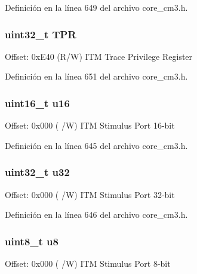 Definición en la línea 649 del archivo core\+\_\+cm3.\+h.

\subsubsection[{\texorpdfstring{T\+PR}{TPR}}]{ uint32\+\_\+t T\+PR}\hypertarget{struct_i_t_m___type_a72bb9b7d61fe3262cd2a6070a7bd5b69}{}\label{struct_i_t_m___type_a72bb9b7d61fe3262cd2a6070a7bd5b69}
Offset\+: 0x\+E40 (R/W) I\+TM Trace Privilege Register 

Definición en la línea 651 del archivo core\+\_\+cm3.\+h.

\subsubsection[{\texorpdfstring{u16}{u16}}]{ uint16\+\_\+t u16}\hypertarget{struct_i_t_m___type_ae8d499140220fa6d4eab1da7262bf08e}{}\label{struct_i_t_m___type_ae8d499140220fa6d4eab1da7262bf08e}
Offset\+: 0x000 ( /W) I\+TM Stimulus Port 16-\/bit 

Definición en la línea 645 del archivo core\+\_\+cm3.\+h.

\subsubsection[{\texorpdfstring{u32}{u32}}]{ uint32\+\_\+t u32}\hypertarget{struct_i_t_m___type_acaf6d0e14a3d4b541c624913b4a1931e}{}\label{struct_i_t_m___type_acaf6d0e14a3d4b541c624913b4a1931e}
Offset\+: 0x000 ( /W) I\+TM Stimulus Port 32-\/bit 

Definición en la línea 646 del archivo core\+\_\+cm3.\+h.

\subsubsection[{\texorpdfstring{u8}{u8}}]{ uint8\+\_\+t u8}\hypertarget{struct_i_t_m___type_a0374c0b98ab9de6f71fabff7412df832}{}\label{struct_i_t_m___type_a0374c0b98ab9de6f71fabff7412df832}
Offset\+: 0x000 ( /W) I\+TM Stimulus Port 8-\/bit 


